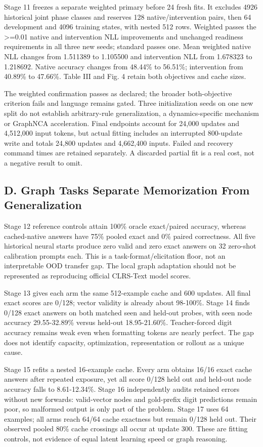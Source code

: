 \documentclass[10pt,letterpaper,twocolumn]{article}
\begin{document}
Stage 11 freezes a separate weighted primary before 24 fresh fits. It excludes 4926 historical joint phase classes and reserves 128 native/\allowbreak{}intervention pairs, then 64 development and 4096 training states, with nested 512 rows. Weighted passes the >=0.01 native and intervention NLL improvements and unchanged readiness requirements in all three new seeds; standard passes one. Mean weighted native NLL changes from 1.511389 to 1.105500 and intervention NLL from 1.678323 to 1.218692. Native accuracy changes from 48.44\% to 56.51\%; intervention from 40.89\% to 47.66\%. Table III and Fig. 4 retain both objectives and cache sizes.

The weighted confirmation passes as declared; the broader both-objective criterion fails and language remains gated. Three initialization seeds on one new split do not establish arbitrary-rule generalization, a dynamics-specific mechanism or GraphNCA acceleration. Final endpoints account for 24,000 updates and 4,512,000 input tokens, but actual fitting includes an interrupted 800-update write and totals 24,800 updates and 4,662,400 inputs. Failed and recovery command times are retained separately. A discarded partial fit is a real cost, not a negative result to omit.

\subsection*{D. Graph Tasks Separate Memorization From Generalization}
Stage 12 reference controls attain 100\% oracle exact/\allowbreak{}paired accuracy, whereas cached-native answers have 75\% pooled exact and 0\% paired correctness. All five historical neural starts produce zero valid and zero exact answers on 32 zero-shot calibration prompts each. This is a task-format/\allowbreak{}elicitation floor, not an interpretable OOD transfer gap. The local graph adaptation should not be represented as reproducing official CLRS-Text model scores.

Stage 13 gives each arm the same 512-example cache and 600 updates. All final exact scores are 0/\allowbreak{}128; vector validity is already about 98-100\%. Stage 14 finds 0/\allowbreak{}128 exact answers on both matched seen and held-out probes, with seen node accuracy 29.55-32.89\% versus held-out 18.95-21.60\%. Teacher-forced digit accuracy remains weak even when formatting tokens are nearly perfect. The gap does not identify capacity, optimization, representation or rollout as a unique cause.

Stage 15 refits a nested 16-example cache. Every arm obtains 16/\allowbreak{}16 exact cache answers after repeated exposure, yet all score 0/\allowbreak{}128 held out and held-out node accuracy falls to 8.61-12.34\%. Stage 16 independently audits retained errors without new forwards: valid-vector nodes and gold-prefix digit predictions remain poor, so malformed output is only part of the problem. Stage 17 uses 64 examples; all arms reach 64/\allowbreak{}64 cache exactness but remain 0/\allowbreak{}128 held out. Their observed pooled 80\% cache crossings all occur at update 300. These are fitting controls, not evidence of equal latent learning speed or graph reasoning.
\end{document}
